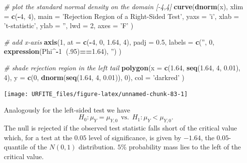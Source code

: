 \documentclass[]{book}
\newenvironment{Shaded}{\begin{snugshade}}{\end{snugshade}}
\newcommand{\KeywordTok}[1]{\textcolor[rgb]{0.13,0.29,0.53}{\textbf{#1}}}
\newcommand{\DataTypeTok}[1]{\textcolor[rgb]{0.13,0.29,0.53}{#1}}
\newcommand{\DecValTok}[1]{\textcolor[rgb]{0.00,0.00,0.81}{#1}}
\newcommand{\FloatTok}[1]{\textcolor[rgb]{0.00,0.00,0.81}{#1}}
\newcommand{\StringTok}[1]{\textcolor[rgb]{0.31,0.60,0.02}{#1}}
\newcommand{\CommentTok}[1]{\textcolor[rgb]{0.56,0.35,0.01}{\textit{#1}}}
\newcommand{\OperatorTok}[1]{\textcolor[rgb]{0.81,0.36,0.00}{\textbf{#1}}}
\newcommand{\NormalTok}[1]{#1}
\theoremstyle{definition}
\theoremstyle{definition}
\theoremstyle{definition}
\theoremstyle{remark}
\begin{document}
\begin{Shaded}
\begin{Highlighting}[]
\CommentTok{# plot the standard normal density on the domain [-4,4]}
\KeywordTok{curve}\NormalTok{(}\KeywordTok{dnorm}\NormalTok{(x),}
      \DataTypeTok{xlim =} \KeywordTok{c}\NormalTok{(}\OperatorTok{-}\DecValTok{4}\NormalTok{, }\DecValTok{4}\NormalTok{),}
      \DataTypeTok{main =} \StringTok{'Rejection Region of a Right-Sided Test'}\NormalTok{,}
      \DataTypeTok{yaxs =} \StringTok{'i'}\NormalTok{,}
      \DataTypeTok{xlab =} \StringTok{'t-statistic'}\NormalTok{,}
      \DataTypeTok{ylab =} \StringTok{''}\NormalTok{,}
      \DataTypeTok{lwd =} \DecValTok{2}\NormalTok{,}
      \DataTypeTok{axes =} \StringTok{'F'}
\NormalTok{)}

\CommentTok{# add x-axis}
\KeywordTok{axis}\NormalTok{(}\DecValTok{1}\NormalTok{, }
     \DataTypeTok{at =} \KeywordTok{c}\NormalTok{(}\OperatorTok{-}\DecValTok{4}\NormalTok{, }\DecValTok{0}\NormalTok{, }\FloatTok{1.64}\NormalTok{, }\DecValTok{4}\NormalTok{), }
     \DataTypeTok{padj =} \FloatTok{0.5}\NormalTok{,}
     \DataTypeTok{labels =} \KeywordTok{c}\NormalTok{(}\StringTok{''}\NormalTok{, }\DecValTok{0}\NormalTok{, }\KeywordTok{expression}\NormalTok{(Phi}\OperatorTok{^-}\DecValTok{1}\OperatorTok{~}\NormalTok{(.}\DecValTok{95}\NormalTok{)}\OperatorTok{==}\FloatTok{1.64}\NormalTok{), }\StringTok{''}\NormalTok{)}
\NormalTok{)}

\CommentTok{# shade rejection region in the left tail}
\KeywordTok{polygon}\NormalTok{(}\DataTypeTok{x =} \KeywordTok{c}\NormalTok{(}\FloatTok{1.64}\NormalTok{, }\KeywordTok{seq}\NormalTok{(}\FloatTok{1.64}\NormalTok{, }\DecValTok{4}\NormalTok{, }\FloatTok{0.01}\NormalTok{), }\DecValTok{4}\NormalTok{),}
        \DataTypeTok{y =} \KeywordTok{c}\NormalTok{(}\DecValTok{0}\NormalTok{, }\KeywordTok{dnorm}\NormalTok{(}\KeywordTok{seq}\NormalTok{(}\FloatTok{1.64}\NormalTok{, }\DecValTok{4}\NormalTok{, }\FloatTok{0.01}\NormalTok{)), }\DecValTok{0}\NormalTok{), }
        \DataTypeTok{col =} \StringTok{'darkred'}
\NormalTok{)}
\end{Highlighting}
\end{Shaded}

\begin{center}\texttt{[image: URFITE\_files/figure-latex/unnamed-chunk-83-1]} \end{center}

Analogously for the left-sided test we have
\[H_0: \mu_Y = \mu_{Y,0} \ \ \text{vs.} \ \ H_1: \mu_Y < \mu_{Y,0}.\]
The null is rejected if the observed test statistic falls short of the
critical value which, for a test at the \(0.05\) level of significance,
is given by \(-1.64\), the \(0.05\)-quantile of the \(N(0,1)\)
distribution. \(5\%\) probability mass lies to the left of the critical
value.
\end{document}
